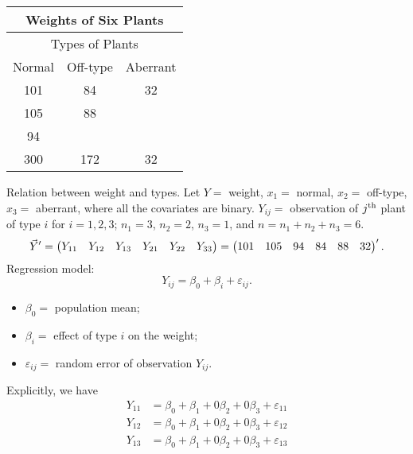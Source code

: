 \begin{Example}{}{}
    \begin{center}
        \begin{tabular}{ccc}
            \toprule
            \multicolumn{3}{c}{Weights of Six Plants} \\
            \midrule
            \multicolumn{3}{c}{Types of Plants}       \\
            \midrule
            Normal & Off-type & Aberrant              \\
            101    & 84       & 32                    \\
            105    & 88                               \\
            94                                        \\
            \midrule\midrule
            300    & 172      & 32                    \\
            \bottomrule
        \end{tabular}
    \end{center}
    Relation between weight and types.
    Let $ Y= $ weight, $ x_1= $ normal, $ x_2= $ off-type, $ x_3= $ aberrant,
    where all the covariates are binary.
    $ Y_{ij}= $ observation of $ j\textsuperscript{th} $ plant of type $ i $ for $ i=1,2,3 $;
    $ n_1=3 $, $ n_2=2 $, $ n_3=1 $, and $ n=n_1+n_2+n_3=6 $.
    \[ \vec{Y}'=\begin{pmatrix}
            Y_{11} & Y_{12} & Y_{13} & Y_{21} & Y_{22} & Y_{33}
        \end{pmatrix}=\begin{pmatrix}
            101 & 105 & 94 & 84 & 88 & 32
        \end{pmatrix}'. \]
    Regression model:
    \[ Y_{ij}=\beta_0+\beta_i+\varepsilon_{ij}. \]
    \begin{itemize}
        \item $ \beta_0= $ population mean;
        \item $ \beta_i= $ effect of type $ i $ on the weight;
        \item $ \varepsilon_{ij}= $ random error of observation $ Y_{ij} $.
    \end{itemize}
    Explicitly, we have
    \begin{align*}
        Y_{11} & =\beta_0+\beta_1+0\beta_2+0\beta_3+\varepsilon_{11}  \\
        Y_{12} & =\beta_0+\beta_1+0\beta_2+0\beta_3+\varepsilon_{12}  \\
        Y_{13} & =\beta_0+\beta_1+0\beta_2+0\beta_3+\varepsilon_{13}  \\

\end{align*}
\end{Example}
